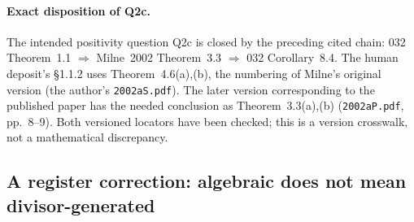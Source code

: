 \paragraph{Exact disposition of Q2c.}
The intended positivity question Q2c is closed by the preceding cited
chain: 032 Theorem~1.1 $\Rightarrow$ Milne~2002 Theorem~3.3 $\Rightarrow$
032 Corollary~8.4.  The human deposit's \S1.1.2 uses
Theorem~4.6(a),(b), the numbering of Milne's original version
(the author's \texttt{2002aS.pdf}).  The later version corresponding to
the published paper has the needed conclusion as Theorem~3.3(a),(b)
(\texttt{2002aP.pdf}, pp.~8--9).  Both versioned locators have been
checked; this is a version crosswalk, not a mathematical discrepancy.

\subsection{A register correction: algebraic does not mean divisor-generated}

